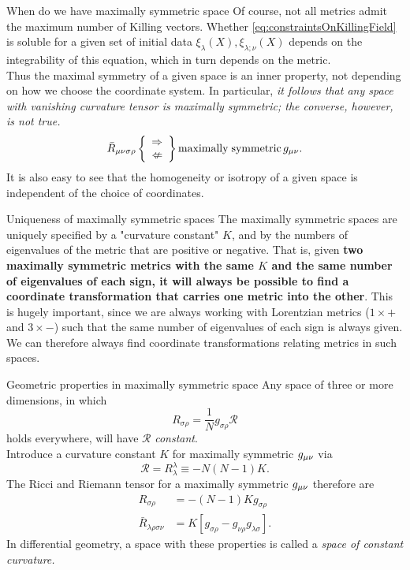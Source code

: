 \begin{mybox}{When do we have maximally symmetric space}
	Of course, not all metrics admit the maximum number of Killing vectors. Whether \ref{eq:constraintsOnKillingField} is soluble for a given set of initial data $\xi_\lambda(X), \xi_{\lambda;\nu}(X)$ depends on the integrability of this equation, which in turn depends on the metric.\\
Thus the maximal symmetry of a given space is an inner property, not depending on how we choose the coordinate system. In particular, \emph{it follows that any space with vanishing curvature tensor is maximally symmetric; the converse, however, is not true.}
	\begin{equation}
		\bar{R}_{\mu \nu \sigma \rho} \left\{ \begin{array}{lr}
		\Rightarrow\\
		\nLeftarrow
		\end{array} \right\} \mathrm{maximally \; symmetric} \, g_{\mu \nu}.
	\end{equation}
	It is also easy to see that the homogeneity or isotropy of a given space is independent of the choice of coordinates.
\end{mybox}
\begin{mybox}{Uniqueness of maximally symmetric spaces}
	The maximally symmetric spaces are uniquely specified by a "curvature constant" $K$, and by the numbers of eigenvalues of the metric that are positive or negative. That is, given \textbf{two maximally symmetric metrics with the same $K$ and the same number of eigenvalues of each sign, it will always be possible to find a coordinate transformation that carries one metric into the other}. This is  hugely important, since we are always working with Lorentzian metrics ($1 \times +$ and $3 \times -$) such that the same number of eigenvalues of each sign is always given. We can therefore always find coordinate transformations relating metrics in such spaces.
\end{mybox}
\begin{mybox}{Geometric properties in maximally symmetric space}
	Any space of three or more dimensions, in which 
	\begin{equation}
	R_{\sigma \rho} = \frac{1}{N} g_{\sigma \rho} \mathcal{R}
	\end{equation}
	holds everywhere, will have $\mathcal{R}$ \emph{constant}.\\
	Introduce a curvature constant $K$ for maximally symmetric $g_{\mu \nu}$ via
	\begin{equation}
		\label{eq:curvatureconstant}
		\mathcal{R}=R^\lambda_\lambda \equiv -N(N-1) K.
	\end{equation}
	The Ricci and Riemann tensor for a maximally symmetric $g_{\mu \nu}$ therefore are
	\begin{align}
		\label{eq:RicciRiemannitoCurvatureConstant}
		R_{\sigma \rho} &= -(N-1) K g_{\sigma \rho} \\
		\bar{R}_{\lambda \rho \sigma \nu} &= K \left[g_{\sigma \rho} - g_{\nu \rho} g_{\lambda \sigma} \right].
	\end{align}
In differential geometry, a space with these properties is called a \emph{space of constant curvature.}
\end{mybox}
